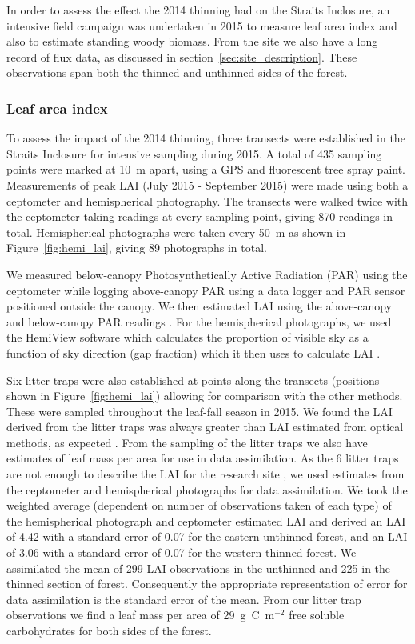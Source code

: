 In order to assess the effect the 2014 thinning had on the Straits Inclosure, an intensive field campaign was undertaken in 2015 to measure leaf area index and also to estimate standing woody biomass. From the site we also have a long record of flux data, as discussed in section~\ref{sec:site_description}. These observations span both the thinned and unthinned sides of the forest.

\subsubsection{Leaf area index}

To assess the impact of the 2014 thinning, three transects were established in the Straits Inclosure for intensive sampling during 2015. A total of 435 sampling points were marked at 10~m apart, using a GPS and fluorescent tree spray paint. Measurements of peak LAI (July 2015 - September 2015) were made using both a ceptometer and hemispherical photography. The transects were walked twice with the ceptometer taking readings at every sampling point, giving 870 readings in total. Hemispherical photographs were taken every 50~m as shown in Figure~\ref{fig:hemi_lai}, giving 89 photographs in total. 

We measured below-canopy Photosynthetically Active Radiation (PAR) using the ceptometer while logging above-canopy PAR using a data logger and PAR sensor positioned outside the canopy. We then estimated LAI using the above-canopy and below-canopy PAR readings \citep{fassnacht1994comparison}. For the hemispherical photographs, we used the HemiView software \citep{rich1999hemiview} which calculates the proportion of visible sky as a function of sky direction (gap fraction) which it then uses to calculate LAI \citep{Jonckheere2004}.

Six litter traps were also established at points along the transects (positions shown in Figure~\ref{fig:hemi_lai}) allowing for comparison with the other methods. These were sampled throughout the leaf-fall season in 2015. We found the LAI derived from the litter traps was always greater than LAI estimated from optical methods, as expected \citep{breda2003ground}. From the sampling of the litter traps we also have estimates of leaf mass per area for use in data assimilation. As the 6 litter traps are not enough to describe the LAI for the research site \citep{kimmins1973some}, we used estimates from the ceptometer and hemispherical photographs for data assimilation. We took the weighted average (dependent on number of observations taken of each type) of the hemispherical photograph and ceptometer estimated LAI and derived an LAI of 4.42 with a standard error of 0.07 for the eastern unthinned forest, and an LAI of 3.06 with a standard error of 0.07 for the western thinned forest. We assimilated the mean of 299 LAI observations in the unthinned and 225 in the thinned section of forest. Consequently the appropriate representation of error for data assimilation is the standard error of the mean. From our litter trap observations we find a leaf mass per area of 29~g~C~m\(^{-2}\) free soluble carbohydrates for both sides of the forest.


